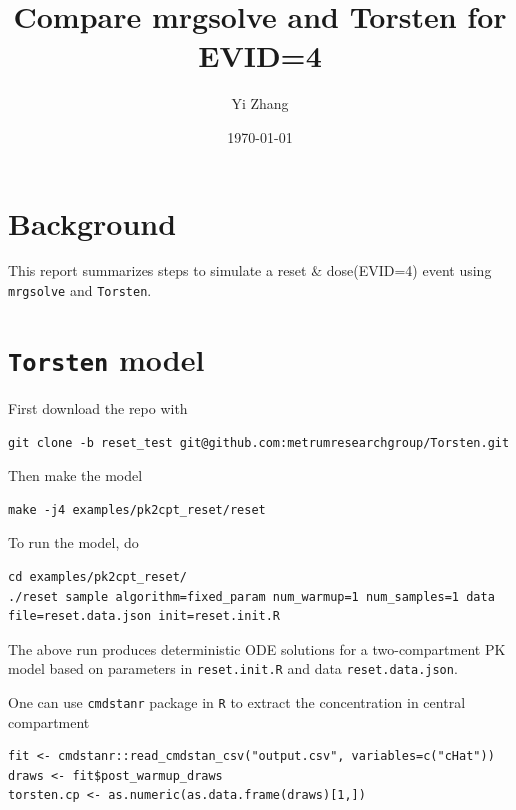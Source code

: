 \documentclass[11pt]{article}
\author{Yi Zhang}
\date{\today}
\title{Compare mrgsolve and Torsten for EVID=4}
\begin{document}
\maketitle

\section{Background}
\label{sec:orgdb707e1}
This report summarizes steps to simulate a reset \& dose(EVID=4) event
using \texttt{mrgsolve} and \texttt{Torsten}.

\section{\texttt{Torsten} model}
\label{sec:org2a6b3d0}
First download the repo with
\begin{verbatim}
git clone -b reset_test git@github.com:metrumresearchgroup/Torsten.git
\end{verbatim}
Then make the model
\begin{verbatim}
make -j4 examples/pk2cpt_reset/reset
\end{verbatim}
To run the model, do
\begin{verbatim}
cd examples/pk2cpt_reset/
./reset sample algorithm=fixed_param num_warmup=1 num_samples=1 data file=reset.data.json init=reset.init.R
\end{verbatim}
The above run produces deterministic ODE solutions for
a two-compartment PK model based on
parameters in \texttt{reset.init.R} and data \texttt{reset.data.json}.

One can use \texttt{cmdstanr} package in \texttt{R} to extract the concentration in central compartment
\begin{verbatim}
fit <- cmdstanr::read_cmdstan_csv("output.csv", variables=c("cHat"))
draws <- fit$post_warmup_draws
torsten.cp <- as.numeric(as.data.frame(draws)[1,])
\end{verbatim}
\end{document}
